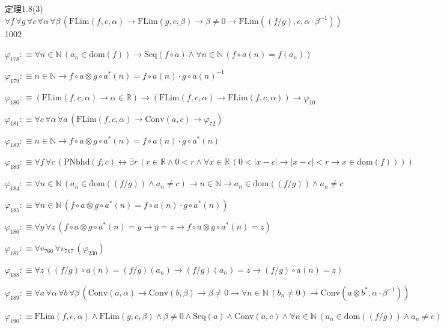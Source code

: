 \begin{fullproof}{定理1.8(3)}{$\forall f\,\forall g\,\forall c\,\forall \alpha\,\forall \beta\,(\mathrm{FLim}(f,c,\alpha) \to \mathrm{FLim}(g,c,\beta) \to \beta \neq 0 \to \mathrm{FLim}((f / g),c,\alpha \cdot \beta^{-1}))$}{1002}
\begin{abbrevlist}
\item $\varphi_{178} :\equiv \forall n \in \mathbb{N}\,(a_{n} \in \mathrm{dom}(f)) \to \mathrm{Seq}(f \circ a) \land \forall n \in \mathbb{N}\,(f \circ a(n) = f(a_{n}))$
\item $\varphi_{179} :\equiv n \in \mathbb{N} \to f \circ a \otimes g \circ a^{\ast}(n) = f \circ a(n) \cdot g \circ a(n)^{-1}$
\item $\varphi_{180} :\equiv (\mathrm{FLim}(f,c,\alpha) \to \alpha \in \mathbb{R}) \to (\mathrm{FLim}(f,c,\alpha) \to \mathrm{FLim}(f,c,\alpha)) \to \varphi_{10}$
\item $\varphi_{181} :\equiv \forall c\,\forall \alpha\,\forall a\,(\mathrm{FLim}(f,c,\alpha) \to \mathrm{Conv}(a,c) \to \varphi_{72})$
\item $\varphi_{182} :\equiv n \in \mathbb{N} \to f \circ a \otimes g \circ a^{\ast}(n) = f \circ a(n) \cdot g \circ a^{\ast}(n)$
\item $\varphi_{183} :\equiv \forall f\,\forall c\,(\mathrm{PNbhd}(f,c) \leftrightarrow \exists r\,(r \in \mathbb{R} \land 0 < r \land \forall x \in \mathbb{R}\,(0 < \lvert x - c \rvert \to \lvert x - c \rvert < r \to x \in \mathrm{dom}(f))))$
\item $\varphi_{184} :\equiv \forall n \in \mathbb{N}\,(a_{n} \in \mathrm{dom}((f / g)) \land a_{n} \neq c) \to n \in \mathbb{N} \to a_{n} \in \mathrm{dom}((f / g)) \land a_{n} \neq c$
\item $\varphi_{185} :\equiv \forall n \in \mathbb{N}\,(f \circ a \otimes g \circ a^{\ast}(n) = f \circ a(n) \cdot g \circ a^{\ast}(n))$
\item $\varphi_{186} :\equiv \forall y\,\forall z\,(f \circ a \otimes g \circ a^{\ast}(n) = y \to y = z \to f \circ a \otimes g \circ a^{\ast}(n) = z)$
\item $\varphi_{187} :\equiv \forall v_{766}\,\forall v_{767}\,(\varphi_{230})$
\item $\varphi_{188} :\equiv \forall z\,((f / g) \circ a(n) = (f / g)(a_{n}) \to (f / g)(a_{n}) = z \to (f / g) \circ a(n) = z)$
\item $\varphi_{189} :\equiv \forall a\,\forall \alpha\,\forall b\,\forall \beta\,(\mathrm{Conv}(a,\alpha) \to \mathrm{Conv}(b,\beta) \to \beta \neq 0 \to \forall n \in \mathbb{N}\,(b_{n} \neq 0) \to \mathrm{Conv}(a \otimes b^{\ast},\alpha \cdot \beta^{-1}))$
\item $\varphi_{190} :\equiv \mathrm{FLim}(f,c,\alpha) \land \mathrm{FLim}(g,c,\beta) \land \beta \neq 0 \land \mathrm{Seq}(a) \land \mathrm{Conv}(a,c) \land \forall n \in \mathbb{N}\,(a_{n} \in \mathrm{dom}((f / g)) \land a_{n} \neq c)$

\end{abbrevlist}
\end{fullproof}
